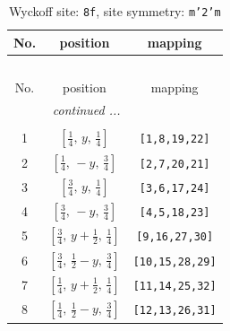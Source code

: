 \documentclass[fleqn,8pt]{jsarticle}
\begin{document}
\begin{longtable}{ccc}
\caption{Wyckoff site: {\tt 8f}, site symmetry: {\tt m'2'm}}
 \\
 \hline \hline
No. & position & mapping \\ \hline \endfirsthead

\multicolumn{2}{l}{\tablename\ \thetable{}} \\
 \hline \hline
No. & position & mapping \\ \hline \endhead

 \hline \hline
\multicolumn{2}{r}{\footnotesize\it continued ...} \\ \endfoot

 \hline \hline
\multicolumn{2}{r}{} \\ \endlastfoot

1 & $\left[ \frac{1}{4},\, y,\, \frac{1}{4} \right]$ & {\tt [1,8,19,22]} \\ \hline
2 & $\left[ \frac{1}{4},\, - y,\, \frac{3}{4} \right]$ & {\tt [2,7,20,21]} \\ \hline
3 & $\left[ \frac{3}{4},\, y,\, \frac{1}{4} \right]$ & {\tt [3,6,17,24]} \\ \hline
4 & $\left[ \frac{3}{4},\, - y,\, \frac{3}{4} \right]$ & {\tt [4,5,18,23]} \\ \hline
5 & $\left[ \frac{3}{4},\, y + \frac{1}{2},\, \frac{1}{4} \right]$ & {\tt [9,16,27,30]} \\ \hline
6 & $\left[ \frac{3}{4},\, \frac{1}{2} - y,\, \frac{3}{4} \right]$ & {\tt [10,15,28,29]} \\ \hline
7 & $\left[ \frac{1}{4},\, y + \frac{1}{2},\, \frac{1}{4} \right]$ & {\tt [11,14,25,32]} \\ \hline
8 & $\left[ \frac{1}{4},\, \frac{1}{2} - y,\, \frac{3}{4} \right]$ & {\tt [12,13,26,31]} \\
\end{longtable}
\renewcommand{\arraystretch}{1.2}
\end{document}
